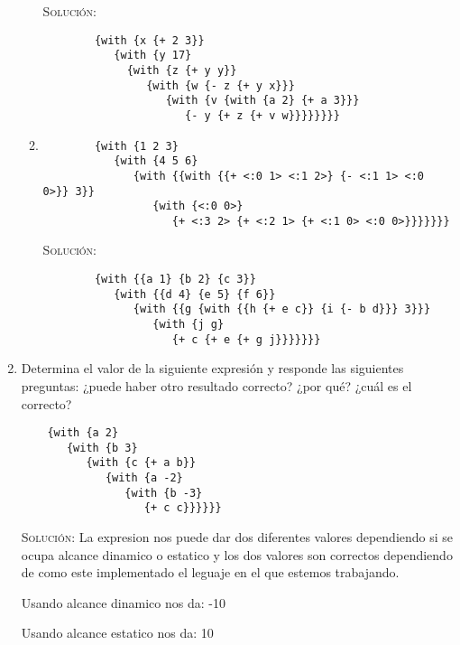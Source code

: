 \documentclass[letterpaper,11pt]{article}
\begin{document}
\begin{enumerate}
\begin{enumerate}
        \textsc{Solución:}
        \begin{verbatim}
        {with {x {+ 2 3}} 
           {with {y 17} 
             {with {z {+ y y}} 
                {with {w {- z {+ y x}}} 
                   {with {v {with {a 2} {+ a 3}}} 
                      {- y {+ z {+ v w}}}}}}}}
        \end{verbatim}

        \item 
        \begin{verbatim}
        {with {1 2 3} 
           {with {4 5 6} 
              {with {{with {{+ <:0 1> <:1 2>} {- <:1 1> <:0 0>}} 3}} 
              	 {with {<:0 0>}
                 	{+ <:3 2> {+ <:2 1> {+ <:1 0> <:0 0>}}}}}}}
        \end{verbatim}

        \textsc{Solución:}
        \begin{verbatim}
        {with {{a 1} {b 2} {c 3}} 
           {with {{d 4} {e 5} {f 6}} 
              {with {{g {with {{h {+ e c}} {i {- b d}}} 3}}}
              	 {with {j g}
                 	{+ c {+ e {+ g j}}}}}}}
        \end{verbatim}
    \end{enumerate}

    \item Determina el valor de la siguiente expresión y responde las siguientes 
    preguntas: ¿puede haber otro resultado correcto? ¿por qué? ¿cuál es el 
    correcto? 
    \begin{verbatim}
    {with {a 2} 
       {with {b 3} 
          {with {c {+ a b}} 
             {with {a -2} 
                {with {b -3} 
                   {+ c c}}}}}}
    \end{verbatim}

    \textsc{Solución:} La expresion nos puede dar dos diferentes valores dependiendo si se ocupa alcance dinamico 	o estatico y los dos valores son correctos dependiendo de como este implementado el leguaje en el que 				estemos trabajando.
    
    Usando alcance dinamico nos da: -10
    
    Usando alcance estatico nos da:  10
\end{enumerate}
\end{document}
